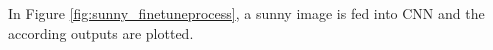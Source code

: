 In Figure \ref{fig:sunny_finetuneprocess}, a sunny image is fed into CNN and the according outputs are plotted.

\begin{figure}[!htb]
    \centering
\end{figure}
